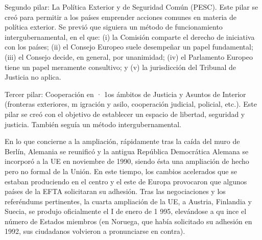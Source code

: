 \documentclass[10pt,a4paper]{article}
\begin{document}
Segundo pilar: La Política Exterior y de Seguridad Común (PESC). Este pilar se creó para permitir a los países emprender acciones comunes en materia de política exterior. Se previó que siguiera un método de funcionamiento intergubernamental, en el que:  (i) la Comisión comparte el derecho de iniciativa con los países; (ii) el Consejo Europeo suele desempeñar un papel fundamental; (iii) el Consejo decide, en general, por unanimidad; (iv) el Parlamento Europeo tiene un papel meramente consultivo; y (v) la jurisdicción del Tribunal de Justicia no aplica.

Tercer pilar: Cooperación en · 1os ámbitos de Justicia y Asuntos de Interior (fronteras exteriores, m igración y asilo, cooperación judicial, policial, etc.). Este pilar se creó con el objetivo de establecer un espacio de libertad, seguridad y justicia. También seguía un método intergubernamental.

En lo que concierne a la ampliación, rápidamente tras la caída del muro de Berlín, Alemania se reunificó y la antigua República Democrática Alemana se incorporó a la UE en noviembre de 1990, siendo ésta una ampliación de hecho pero no formal de la Unión. En este tiempo, los cambios acelerados que se estaban produciendo en el centro y el este de Europa provocaron que algunos países de la EFTA solicitaran su adhesión. Tras las negociaciones y los referéndums pertinentes, la cuarta ampliación de la UE, a Austria, Finlandia y Suecia, se produjo oficialmente el I de enero de 1 995, elevándose a qu ince el número de Estados miembros (en Noruega, que había solicitado su adhesión en 1992, sus ciudadanos volvieron a pronunciarse en contra).
\end{document}
